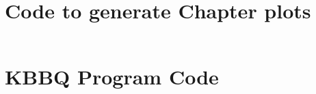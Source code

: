 
\chapter{Code to generate Chapter \protect\cheatreference{} plots}
\label{ch:kbbq_plot_code}
\inputminted{r}{ch4/scripts/plot_benchmarks.R}

\chapter{KBBQ Program Code}
\label{ch:kbbq_code}
\inputminted[breaklines]{cpp}{ch4/scripts/kbbq_include.hh}
\inputminted[breaklines]{cpp}{ch4/scripts/kbbq_src.cc}
